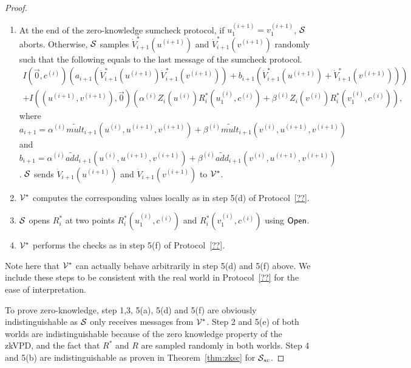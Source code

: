 \begin{proof}
\begin{enumerate}
\begin{enumerate}
	\item At the end of the zero-knowledge sumcheck protocol, if $u_1^{(i+1)} = v_1^{(i+1)}$, $\S$ aborts. Otherwise, $\S$ samples $\dot{V}^*_{i+1}(u^{(i+1)})$ and $\dot{V}^*_{i+1}(v^{(i+1)})$ randomly such that the following equals to the last message of the sumcheck protocol.
	\begin{align*}
	I(\vec{0},c^{(i)})(a_{i+1}(\dot{V}^*_{i+1}(u^{(i+1)})\dot{V}^*_{i+1}(v^{(i+1)}))+b_{i+1}(\dot{V}^*_{i+1}(u^{(i+1)})+\dot{V}^*_{i+1}(v^{(i+1)})))\\
	+I((u^{(i+1)},v^{(i+1)}),\vec{0})(\alpha^{(i)}Z_i(u^{(i)})R^*_i(u_1^{(i)}, c^{(i)})+\beta^{(i)}Z_i(v^{(i)})R^*_i(v_1^{(i)}, c^{(i)})),
	\end{align*}
	where $a_{i+1} = \alpha^{(i)}\tilde{mult}_{i+1}(u^{(i)}, u^{(i+1)}, v^{(i+1)})+\beta^{(i)}\tilde{mult}_{i+1}(v^{(i)}, u^{(i+1)}, v^{(i+1)})$ and $b_{i+1} = \alpha^{(i)}\tilde{add}_{i+1}(u^{(i)}, u^{(i+1)}, v^{(i+1)})+\beta^{(i)}\tilde{add}_{i+1}(v^{(i)}, u^{(i+1)}, v^{(i+1)})$. $\S$ sends $\dot{V}_{i+1}(u^{(i+1)})$ and $\dot{V}_{i+1}(v^{(i+1)})$ to $\V^*$.
	
	\item $\V^*$ computes the corresponding values locally as in step 5(d) of Protocol~\ref{??}.
	\item $\S$ opens $R^*_i$ at two points $R^*_i(u_1^{(i)},c^{(i)})$ and $R^*_i(v_1^{(i)},c^{(i)})$ using $\Open$.
	\item $\V^*$ performs the checks as in step 5(f) of Protocol~\ref{??}.
	\end{enumerate}
\end{enumerate} 

Note here that $\V^*$ can actually behave arbitrarily in step 5(d) and 5(f) above. We include these steps to be consistent with the real world in  Protocol~\ref{??} for the ease of interpretation.

To prove zero-knowledge, step 1,3, 5(a), 5(d) and 5(f) are obviously indistinguishable as $\S$ only receives messages from $\V^*$. Step 2 and 5(e) of both worlds are indistinguishable because of the zero knowledge property of the zkVPD, and the fact that $R^*$ and $R$ are sampled randomly in both worlds. Step 4 and 5(b) are indistinguishable as proven in Theorem~\ref{thm:zksc} for $\S_{sc}$.  



\end{proof}

